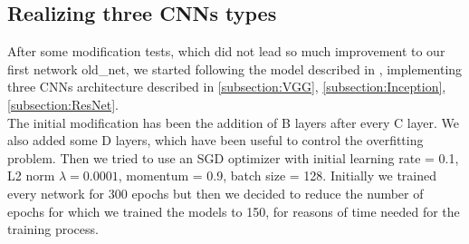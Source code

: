 \documentclass[10pt,twocolumn,letterpaper]{article}
\begin{document}
\subsection{Realizing three CNNs types}
After some modification tests, which did not lead so much improvement to our first network old\_net, we started following the model described in \cite{147}, implementing three CNNs architecture described in \ref{subsection:VGG}, \ref{subsection:Inception}, \ref{subsection:ResNet}.\\
The initial modification has been the addition of B layers after every C layer. We also added some D layers, which have been useful to control the overfitting problem. Then we tried to use an SGD optimizer with initial learning rate = 0.1, L2 norm $\lambda=0.0001$, momentum = 0.9, batch size = 128. Initially we trained every network for 300 epochs but then we decided to reduce the number of epochs for which we trained the models to 150, for reasons of time needed for the training process. 
\end{document}
